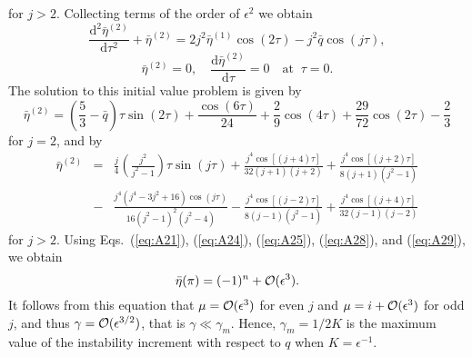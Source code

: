 %
for $j > 2$. Collecting terms of the order of $\epsilon^2$ we obtain
%
\begin{equation}
\frac{\mathrm{d}^2\bar\eta^{(2)}}{\mathrm{d}\tau^2} + \bar\eta^{(2)} = 
   2j^2\bar\eta^{(1)}\cos(2\tau) - j^2\bar q\cos(j\tau),
\label{eq:A26} 
\end{equation}
% 
\begin{equation}
\bar\eta^{(2)} = 0, \quad \frac{\mathrm{d}\bar\eta^{(2)}}{\mathrm{d}\tau} = 0 
   \quad \mbox{at} \;\; \tau = 0.
\label{eq:A27}
\end{equation}
%
The solution to this initial value problem is given by
% 
\begin{equation}
\bar\eta^{(2)} = \left(\frac53 - \bar q\right)\tau\sin(2\tau) + 
   \frac{\cos(6\tau)}{24} + \frac29\cos(4\tau) + 
   \frac{29}{72}\cos(2\tau) - \frac23
\label{eq:A28}
\end{equation}
%
for $j = 2$, and by
% 
\begin{eqnarray}
\bar\eta^{(2)} &=& \frac j4\left(\frac{j^2}{j^2 - 1}\right)\tau\sin(j\tau) + 
   \frac{j^4\cos[(j+4)\tau]}{32(j+1)(j+2)} + 
   \frac{j^4\cos[(j+2)\tau]}{8(j+1)(j^2 - 1)}\nonumber\\ 
&-& \frac{j^4(j^4 - 3j^2 + 16)\cos(j\tau)}{16(j^2 - 1)^2(j^2 - 4)} -
   \frac{j^4\cos[(j-2)\tau]}{8(j-1)(j^2 - 1)} + \frac{j^4\cos[(j+4)\tau]}{32(j-1)(j-2)}
\label{eq:A29}
\end{eqnarray}
% 
for $j > 2$. Using Eqs.~(\ref{eq:A21}), (\ref{eq:A24}), (\ref{eq:A25}), (\ref{eq:A28}), and (\ref{eq:A29}), we obtain
% 
\begin{equation}
\bar\eta(\pi) = (-1)^n + {\cal O}(\epsilon^3).
\label{eq:A30}
\end{equation}
%
It follows from this equation that $\mu = {\cal O}(\epsilon^3)$ for even $j$ and $\mu = i + {\cal O}(\epsilon^3)$ for odd $j$\/, and thus $\gamma = {\cal O}(\epsilon^{3/2})$, that is $\gamma \ll \gamma_m$\/.
Hence, $\gamma_m = 1/2K$ is the maximum value of the instability increment with respect to $q$ when $K = \epsilon^{-1}$\/. 